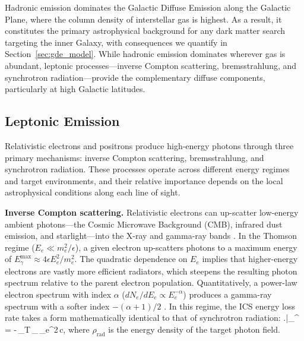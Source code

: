 Hadronic emission dominates the Galactic Diffuse Emission along the Galactic Plane, where the column density of interstellar gas is highest.
As a result, it constitutes the primary astrophysical background for any dark matter search targeting the inner Galaxy, with consequences we quantify in Section~\ref{sec:gde_model}.
While hadronic emission dominates wherever gas is abundant, leptonic processes---inverse Compton scattering, bremsstrahlung, and synchrotron radiation---provide the complementary diffuse components, particularly at high Galactic latitudes.

\subsection{Leptonic Emission}
\label{sec:leptonic}

Relativistic electrons and positrons produce high-energy photons through three primary mechanisms: inverse Compton scattering, bremsstrahlung, and synchrotron radiation.
These processes operate across different energy regimes and target environments, and their relative importance depends on the local astrophysical conditions along each line of sight.

\textbf{Inverse Compton scattering.}
Relativistic electrons can up-scatter low-energy ambient photons---the Cosmic Microwave Background (CMB), infrared dust emission, and starlight---into the X-ray and gamma-ray bands \cite{Blumenthal:1970gc}.
In the Thomson regime ($E_e \ll m_e^2/\epsilon$), a given electron up-scatters photons to a maximum energy of $E_\gamma^\text{max} \approx 4\epsilon E_e^2 / m_e^2$.
The quadratic dependence on $E_e$ implies that higher-energy electrons are vastly more efficient radiators, which steepens the resulting photon spectrum relative to the parent electron population.
Quantitatively, a power-law electron spectrum with index $\alpha$ ($dN_e/dE_e \propto E_e^{-\alpha}$) produces a gamma-ray spectrum with a softer index $-(\alpha+1)/2$ \cite{Hooper:2024}.
In this regime, the ICS energy loss rate takes a form mathematically identical to that of synchrotron radiation: 
\be
	\left.\right|_^ = -\,\sigma_T\,\rho_\,\gamma_e^2\,c,
\ee
where $\rho_\text{rad}$ is the energy density of the target photon field.

